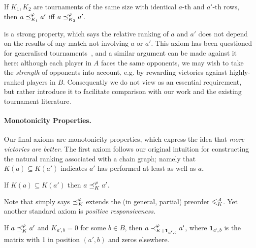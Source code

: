 \begin{axiom}[IIM]

    If $K_1, K_2$ are tournaments of the same size with identical $a$-th and
    $a'$-th rows, then $a \preceq_{K_1}^\varphi a'$ iff $a \preceq_{K_2}^\varphi a'$.

\end{axiom}

 is a strong property, which says the relative ranking of $a$ and
$a'$ does not depend on the results of any match not involving $a$ or $a'$.
This axiom has been questioned for generalised
tournaments~\cite{gonzalez2014paired}, and a similar argument can be made
against it here: although each player in $A$ faces the same opponents, we may
wish to take the \emph{strength} of opponents into account, e.g. by rewarding
victories against highly-ranked players in $B$. Consequently we do not view
 as an essential requirement, but rather introduce it to
facilitate comparison with our work and the existing tournament literature.

\paragraph{Monotonicity Properties.}
%
Our final axioms are monotonicity properties, which express the idea that
\emph{more victories are better}. The first axiom follows our original
intuition for constructing the natural ranking associated with a chain graph;
namely that $K(a) \subseteq K(a')$ indicates $a'$ has performed at least as
well as $a$.

\begin{axiom}[mon]
    If $K(a) \subseteq K(a')$ then $a \preceq_K^\varphi a'$.
\end{axiom}

Note that  simply says ${\preceq_K^\varphi}$ extends the (in general,
partial) preorder ${\leqslant^{\mathcal{A}}_K}$.
%
Yet another standard axiom is \emph{positive responsiveness}.

\begin{axiom}

    If $a \preceq_K^\varphi a'$ and $K_{a',b} = 0$ for some $b \in B$, then $a
    \prec_{K + \bm{1}_{a', b}}^\varphi a'$, where $\bm{1}_{a', b}$ is the matrix
    with 1 in position $(a', b)$ and zeros elsewhere.

\end{axiom}


